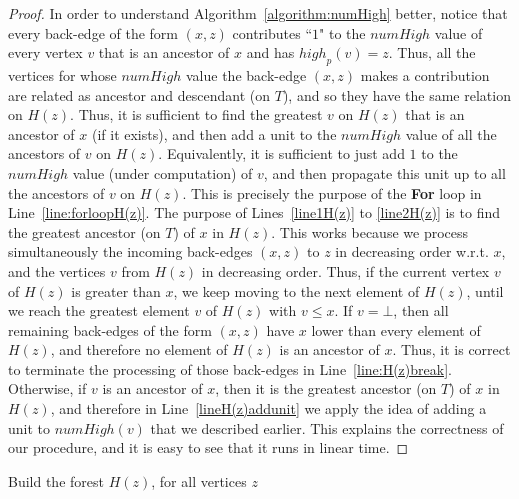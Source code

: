 \documentclass[11pt,a4paper]{article}
\begin{document}
\begin{proof}
In order to understand Algorithm~\ref{algorithm:numHigh} better, notice that every back-edge of the form $(x,z)$ contributes ``$1$" to the $\mathit{numHigh}$ value of every vertex $v$ that is an ancestor of $x$ and has $\mathit{high}_p(v)=z$. Thus, all the vertices for whose $\mathit{numHigh}$ value the back-edge $(x,z)$ makes a contribution are related as ancestor and descendant (on $T$), and so they have the same relation on $H(z)$. Thus, it is sufficient to find the greatest $v$ on $H(z)$ that is an ancestor of $x$ (if it exists), and then add a unit to the $\mathit{numHigh}$ value of all the ancestors of $v$ on $H(z)$. Equivalently, it is sufficient to just add $1$ to the $\mathit{numHigh}$ value (under computation) of $v$, and then propagate this unit up to all the ancestors of $v$ on $H(z)$. This is precisely the purpose of the \textbf{For} loop in Line~\ref{line:forloopH(z)}. The purpose of Lines~\ref{line1H(z)} to \ref{line2H(z)} is to find the greatest ancestor (on $T$) of $x$ in $H(z)$. This works because we process simultaneously the incoming back-edges $(x,z)$ to $z$ in decreasing order w.r.t. $x$, and the vertices $v$ from $H(z)$ in decreasing order. Thus, if the current vertex $v$ of $H(z)$ is greater than $x$, we keep moving to the next element of $H(z)$, until we reach the greatest element $v$ of $H(z)$ with $v \leq x$. If $v=\bot$, then all remaining back-edges of the form $(x,z)$ have $x$ lower than every element of $H(z)$, and therefore no element of $H(z)$ is an ancestor of $x$. Thus, it is correct to terminate the processing of those back-edges in Line~\ref{line:H(z)break}. Otherwise, if $v$ is an ancestor of $x$, then it is the greatest ancestor (on $T$) of $x$ in $H(z)$, and therefore in Line~\ref{lineH(z)addunit} we apply the idea of adding a unit to $\mathit{numHigh}(v)$ that we described earlier. This explains the correctness of our procedure, and it is easy to see that it runs in linear time.

\end{proof}  

\begin{algorithm}[h]
\caption{\textsf{Build the forest $H(z)$, for all vertices $z$}}
\label{algorithm:H(z)forest}
\LinesNumbered
\DontPrintSemicolon


\end{algorithm}
\end{document}
